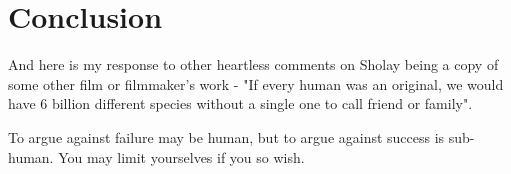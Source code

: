 \documentclass[a4paper,12pt]{article}
\begin{document}
\section{Conclusion}

And here is my response to other heartless comments on Sholay being a copy of some other film or filmmaker's work - "If every human was an original, we would have 6 billion different species without a single one to call friend or family".

To argue against failure may be human, but to argue against success is sub-human. You may limit yourselves if you so wish.
\end{document}

